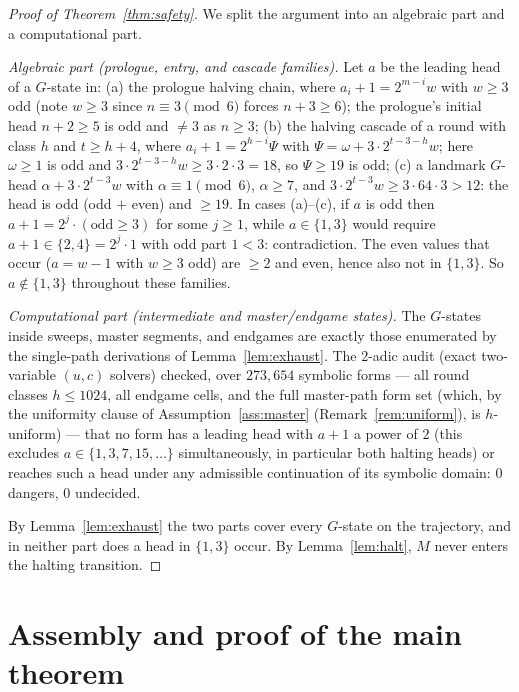 \documentclass[11pt]{amsart}
\theoremstyle{definition}
\begin{document}
\begin{proof}[Proof of Theorem~\ref{thm:safety}]
We split the argument into an algebraic part and a computational part.

\emph{Algebraic part (prologue, entry, and cascade families).}
Let $a$ be the leading head of a $G$-state in:
(a) the prologue halving chain, where $a_i+1=2^{m-i}w$ with $w\ge3$ odd
(note $w\ge3$ since $n\equiv3\pmod6$ forces $n+3\ge6$); the prologue's
initial head $n+2\ge5$ is odd and $\ne3$ as $n\ge3$;
(b) the halving cascade of a round with class $h$ and $t\ge h+4$, where
$a_i+1=2^{h-i}\Psi$ with $\Psi=\omega+3\cdot2^{t-3-h}w$;
here $\omega\ge1$ is odd and $3\cdot2^{t-3-h}w\ge3\cdot2\cdot3=18$, so
$\Psi\ge19$ is odd;
(c) a landmark $G$-head $\alpha+3\cdot2^{t-3}w$ with $\alpha\equiv1\pmod6$,
$\alpha\ge7$, and $3\cdot2^{t-3}w\ge3\cdot64\cdot3>12$: the head is odd
(odd $+$ even) and $\ge19$.
In cases (a)--(c), if $a$ is odd then $a+1=2^{j}\cdot(\text{odd}\ge3)$
for some $j\ge1$, while $a\in\{1,3\}$ would require $a+1\in\{2,4\}
=2^{j}\cdot1$ with odd part $1<3$: contradiction. The even values that
occur ($a=w-1$ with $w\ge3$ odd) are $\ge2$ and even, hence also not in
$\{1,3\}$. So $a\notin\{1,3\}$ throughout these families.

\emph{Computational part (intermediate and master/endgame states).}
The $G$-states inside sweeps, master segments, and endgames are exactly
those enumerated by the single-path derivations of
Lemma~\ref{lem:exhaust}. The $2$-adic audit (exact two-variable $(u,c)$
solvers) checked, over $273{,}654$ symbolic forms --- all round classes
$h\le1024$, all endgame cells, and the full master-path form set (which,
by the uniformity clause of Assumption~\ref{ass:master}
(Remark~\ref{rem:uniform}), is $h$-uniform) --- that no form has a
leading head with $a+1$ a power of $2$ (this excludes $a\in\{1,3,7,15,
\dots\}$ simultaneously, in particular both halting heads) or reaches
such a head under any admissible continuation of its symbolic domain:
$0$ dangers, $0$ undecided.

By Lemma~\ref{lem:exhaust} the two parts cover every $G$-state on the
trajectory, and in neither part does a head in $\{1,3\}$ occur. By
Lemma~\ref{lem:halt}, $M$ never enters the halting transition.
\end{proof}

\section{Assembly and proof of the main theorem}\label{s:assembly}
\end{document}
